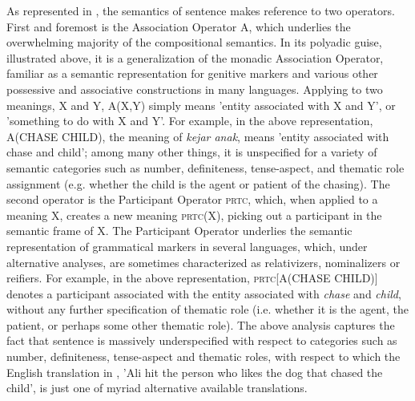 \documentclass[output=paper,colorlinks,citecolor=brown
]{langscibook}
\begin{document}
As represented in , the semantics of sentence  makes reference to two operators. First and foremost is the Association Operator A, which underlies the overwhelming majority of the compositional semantics. In its polyadic guise, illustrated above, it is a generalization of the monadic Association Operator, familiar as a semantic representation for genitive markers and various other possessive and associative constructions in many languages. Applying to two meanings, X and Y, A(X,Y) simply means 'entity associated with X and Y', or 'something to do with X and Y'. For example, in the above representation, A(CHASE CHILD), the meaning of \textit{kejar anak}, means 'entity associated with chase and child'; among many other things, it is unspecified for a variety of semantic categories such as number, definiteness, tense-aspect, and thematic role assignment (e.g. whether the child is the agent or patient of the chasing). The second operator is the Participant Operator \textsc{prtc}, which, when applied to a meaning X, creates a new meaning \textsc{prtc}(X), picking out a participant in the semantic frame of X. The Participant Operator underlies the semantic representation of grammatical markers in several languages, which, under alternative analyses, are sometimes characterized as relativizers, nominalizers or reifiers. For example, in the above representation, \textsc{prtc}[A(CHASE CHILD)] denotes a participant associated with the entity associated with \textit{chase} and \textit{child}, without any further specification of thematic role (i.e. whether it is the agent, the patient, or perhaps some other thematic role). The above analysis captures the fact that sentence  is massively underspecified with respect to categories such as number, definiteness, tense-aspect and thematic roles, with respect to which the English translation in , 'Ali hit the person who likes the dog that chased the child', is just one of myriad alternative available translations.
\end{document}

